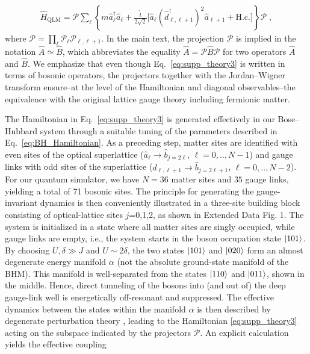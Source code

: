 \documentclass[aps,prl,twocolumn,superscriptaddress,footinbib,linenumbers]{revtex4}
\begin{document}
\begin{align}
\label{eq:supp_theory3}
\hat{H}_{\mathrm{QLM}} =\mathcal{P} \sum_{\ell}\left\{ m \hat{a}^{\dagger}_{\ell} \hat{a}_{\ell} + \frac{\tilde{t}}{2\sqrt{2}} \big[ \hat{a}_{\ell} (\hat{d}^{\dagger}_{\ell,\ell+1})^2 \hat{a}_{\ell+1} + \mathrm{H.c.}\big]\right\}\mathcal{P}\; ,
\end{align}
where $\mathcal{P} = \prod_\ell \mathcal{P}_\ell \mathcal{P}_{\ell,\ell+1}$. In the main text, the projection $\mathcal{P}$ is implied in the notation $\hat{A}\simeq \hat{B}$, which abbreviates the equality $ \hat{A} =\mathcal{P}\hat{B}\mathcal{P}$ for two operators $\hat{A}$ and $\hat{B}$. We emphasize that even though Eq.~\eqref{eq:supp_theory3} is written in terms of bosonic operators, the projectors together with the Jordan--Wigner transform ensure--at the level of the Hamiltonian and diagonal observables--the equivalence with the original lattice gauge theory including fermionic matter.

The Hamiltonian in Eq.~\eqref{eq:supp_theory3} is generated effectively in our Bose--Hubbard system through a suitable tuning of the parameters described in Eq.~\eqref{eq:BH_Hamiltonian}.
As a preceding step, matter sites are identified with even sites of the optical superlattice ($\hat{a}_{\ell}\to \hat{b}_{j = 2\ell}$, $\ell= 0,..,N-1$) and gauge links with odd sites of the superlattice ($\hat{d}_{\ell,\ell+1}\to \hat{b}_{j = 2\ell+1}$, $\ell= 0,..,N-2$). For our quantum simulator, we have $N=36$ matter sites and $35$ gauge links, yielding a total of 71 bosonic sites. The principle for generating the gauge-invariant dynamics is then conveniently illustrated in a three-site building block consisting of optical-lattice sites $j$=0,1,2, as shown in Extended Data Fig. 1. The system is initialized in a state where all matter sites are singly occupied, while gauge links are empty, i.e., the system starts in the boson occupation state $\ket{101}$. By choosing $U,\delta \gg J$ and $U\sim 2\delta$, the two states $\ket{101}$ and $\ket{020}$ form an almost degenerate energy manifold $\alpha$ (not the absolute ground-state manifold of the BHM). This manifold is well-separated from the states $\ket{110}$ and $\ket{011}$, shown in the middle. Hence, direct tunneling of the bosons into (and out of) the deep gauge-link well is energetically off-resonant and suppressed. The effective dynamics between the states within the manifold $\alpha$ is then described by degenerate perturbation theory \cite{Lewenstein:2012s}, leading to the Hamiltonian \ref{eq:supp_theory3} acting on the subspace indicated by the projectors $\mathcal{P}$. An explicit calculation yields the effective coupling
\end{document}
